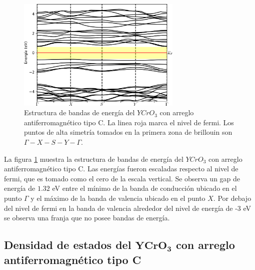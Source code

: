 \begin{figure}[H]
	\centering
	\includegraphics[width=0.7\textwidth]{contenido/resultados/cromita_itrio/img_cromita_itrio/YCrO3_bandas_C_inf.png}
	\singlespace
	\caption[Bandas de energ\'ia del $YCrO_{3}$ con arreglo 
	antiferromagn\'etico tipo C]{Estructura de bandas de energ\'ia del 
	$YCrO_{3}$ con arreglo antiferromagn\'etico tipo C. La linea roja marca el 
	nivel de fermi. Los puntos de alta simetr\'ia tomados en la primera zona de 
	brillouin son $\Gamma - X - S - Y - \Gamma$.}
	\label{yco_band_c}
\end{figure}

La figura \ref{yco_band_c} muestra la estructura de bandas de 
energ\'ia del 
$YCrO_{3}$ con arreglo antiferromagn\'etico tipo C. Las energ\'ias 
fueron escaladas 
respecto al nivel de fermi, que es tomado como el cero de la escala 
vertical. Se observa un gap de 
energ\'ia de $1.32$ eV entre el m\'inimo de la banda de conducci\'on ubicado en 
el punto $\Gamma$ y el 
m\'aximo de la banda de valencia ubicado en el punto $X$. Por debajo 
del nivel de fermi en la banda de valencia 
alrededor del nivel de energ\'ia de -3 eV se observa una franja que no 
posee bandas de energ\'ia. 

\subsection{Densidad de estados del $\mathbf{YCrO_{3}}$ con arreglo      
    antiferromagn\'etico tipo C}


